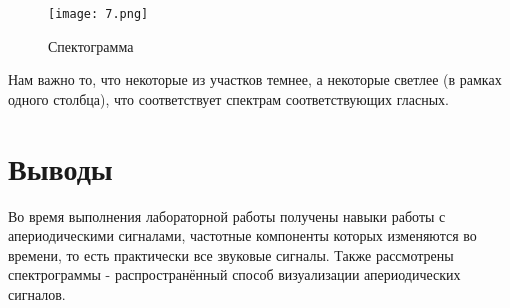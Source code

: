 \documentclass[a4paper,12pt]{report}
\begin{document}
\begin{figure}[H]
        \centering
        \texttt{[image: 7.png]}
        \caption{Спектограмма}
        \label{fig:lab3_fig10}
\end{figure}

Нам важно то, что некоторые из участков темнее, а некоторые светлее (в рамках одного столбца), что соответствует спектрам соответствующих гласных.


\chapter{Выводы}

Во время выполнения лабораторной работы получены навыки работы с апериодическими сигналами, частотные компоненты которых изменяются во времени, то есть практически все звуковые сигналы. Также рассмотрены спектрограммы - распространённый способ визуализации апериодических сигналов.
\end{document}
